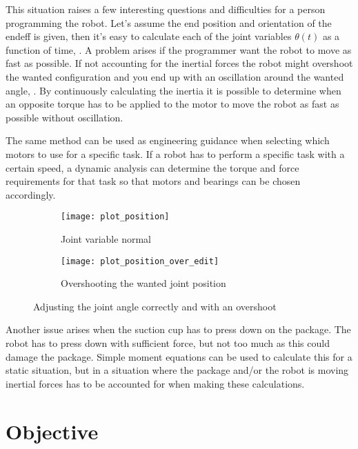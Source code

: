 This situation raises a few interesting questions and difficulties for a person programming the robot. Let's assume the end position and orientation of the \gls{endeff} is given, then it's easy to calculate each of the joint variables $\theta (t)$ as a function of time, . A problem arises if the programmer want the robot to move as fast as possible. If not accounting for the inertial forces the robot might overshoot the wanted configuration and you end up with an oscillation around the wanted angle, . By continuously calculating the inertia it is possible to determine when an opposite torque has to be applied to the motor to move the robot as fast as possible without oscillation.

The same method can be used as engineering guidance when selecting which motors to use for a specific task. If a robot has to perform a specific task with a certain speed, a dynamic analysis can determine the torque and force requirements for that task so that motors and bearings can be chosen accordingly.

\begin{figure}[ht!]
\begin{subfigure}{0.5\textwidth}
    \centering
    \texttt{[image: plot\_position]}
    \caption{Joint variable normal}
    \label{plot_position}
\end{subfigure}
\hfill
\begin{subfigure}{0.5\textwidth}
    \centering
    \texttt{[image: plot\_position\_over\_edit]}
    \caption{Overshooting the wanted joint position}
    \label{plot_position_over}
\end{subfigure}
\caption{Adjusting the joint angle correctly and with an overshoot}
\label{joint_position}
\end{figure}

Another issue arises when the suction cup has to press down on the package. The robot has to press down with sufficient force, but not too much as this could damage the package. Simple moment equations can be used to calculate this for a static situation, but in a situation where the package and/or the robot is moving inertial forces has to be accounted for when making these calculations.


\section{Objective}


